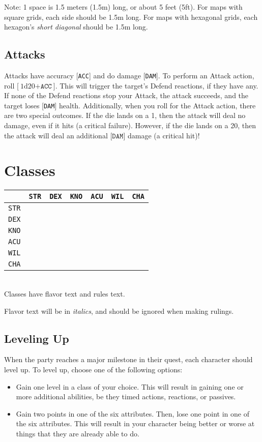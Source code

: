\documentclass[12pt]{article}
\newcommand{\STR}{\texttt{STR}}
\newcommand{\DEX}{\texttt{DEX}}
\newcommand{\KNO}{\texttt{KNO}}
\newcommand{\ACU}{\texttt{ACU}}
\newcommand{\WIL}{\texttt{WIL}}
\newcommand{\CHA}{\texttt{CHA}}
\newcommand{\ACC}{\texttt{ACC}}
\newcommand{\DAM}{\texttt{DAM}}
\newcommand{\dice}[2]{\text{#1d#2}}
\begin{document}
Note: 1 space is 1.5 meters (1.5m) long, or about 5 feet (5ft). For maps with square grids, each side should be 1.5m long. For maps with hexagonal grids, each hexagon’s \textit{short diagonal} should be 1.5m long.

\subsection{Attacks}

Attacks have accuracy [\ACC] and do damage [\DAM]. To perform an Attack action, roll [$\dice{1}{20} + \ACC$]. This will trigger the target’s Defend reactions, if they have any. If none of the Defend reactions stop your Attack, the attack succeeds, and the target loses [\DAM] health. Additionally, when you roll for the Attack action, there are two special outcomes. If the die lands on a 1, then the attack will deal no damage, even if it hits (a critical failure). However, if the die lands on a 20, then the attack will deal an additional [$\DAM$] damage (a critical hit)!

\pagebreak
\section{Classes}

\begin{tabularx}{\textwidth}{c|CCCCCC}
& \STR & \DEX & \KNO & \ACU & \WIL & \CHA \\\hline
\STR &  &  &  &  &  &  \\
\DEX &  &  &  &  &  &  \\
\KNO &  &  &  &  &  &  \\
\ACU &  &  &  &  &  &   \\
\WIL &  &  &  &  &  &  \\
\CHA &  &  &  &  &  &  \\
\end{tabularx}
\\[5mm]
Classes have flavor text and rules text.

Flavor text will be in \textit{italics}, and should be ignored when making rulings.

\subsection{Leveling Up}

When the party reaches a major milestone in their quest, each character should level up. To level up, choose one of the following options:
\begin{itemize}
\item Gain one level in a class of your choice. This will result in gaining one or more additional abilities, be they timed actions, reactions, or passives.
\item Gain two points in one of the six attributes. Then, lose one point in one of the six attributes. This will result in your character being better or worse at things that they are already able to do.
\end{itemize}
\end{document}
